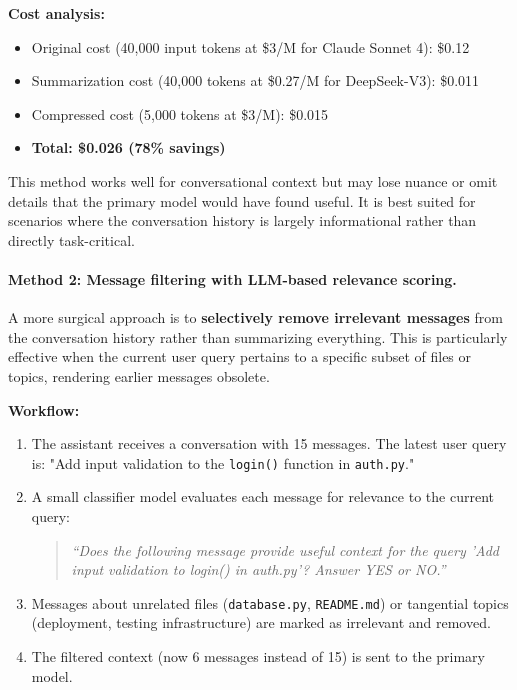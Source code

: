 \documentclass[english]{article}
\begin{document}
\textbf{Cost analysis:}
\begin{itemize}
    \item Original cost (40,000 input tokens at \$3/M for Claude Sonnet 4): \$0.12
    \item Summarization cost (40,000 tokens at \$0.27/M for DeepSeek-V3): \$0.011
    \item Compressed cost (5,000 tokens at \$3/M): \$0.015
    \item \textbf{Total: \$0.026 (78\% savings)}
\end{itemize}

This method works well for conversational context but may lose nuance or omit details that the primary model would have found useful. It is best suited for scenarios where the conversation history is largely informational rather than directly task-critical.

\paragraph{Method 2: Message filtering with LLM-based relevance scoring.}

A more surgical approach is to \textbf{selectively remove irrelevant messages} from the conversation history rather than summarizing everything. This is particularly effective when the current user query pertains to a specific subset of files or topics, rendering earlier messages obsolete.

\textbf{Workflow:}
\begin{enumerate}
    \item The assistant receives a conversation with 15 messages. The latest user query is: "Add input validation to the \texttt{login()} function in \texttt{auth.py}."
    \item A small classifier model evaluates each message for relevance to the current query:
    \begin{quote}
    \textit{``Does the following message provide useful context for the query 'Add input validation to login() in auth.py'? Answer YES or NO.''}
    \end{quote}
    \item Messages about unrelated files (\texttt{database.py}, \texttt{README.md}) or tangential topics (deployment, testing infrastructure) are marked as irrelevant and removed.
    \item The filtered context (now 6 messages instead of 15) is sent to the primary model.
\end{enumerate}
\end{document}
